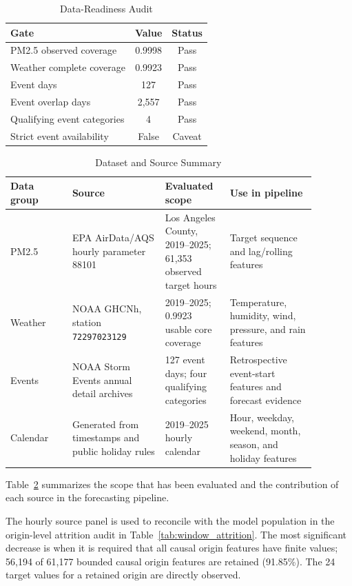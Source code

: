 \documentclass{ieeeaccess}
\begin{document}
\begin{table}[!t]
\centering
\caption{Data-Readiness Audit}
\label{tab:data_audit}
\begin{tabular}{lcc}
\toprule
Gate & Value & Status \\
\midrule
PM2.5 observed coverage & 0.9998 & Pass \\
Weather complete coverage & 0.9923 & Pass \\
Event days & 127 & Pass \\
Event overlap days & 2,557 & Pass \\
Qualifying event categories & 4 & Pass \\
Strict event availability & False & Caveat \\
\bottomrule
\end{tabular}
\end{table}

\begin{table}[!t]
\centering
\caption{Dataset and Source Summary}
\label{tab:dataset_summary}
\begin{tabular}{p{0.18\linewidth}p{0.27\linewidth}p{0.18\linewidth}p{0.25\linewidth}}
\toprule
Data group & Source & Evaluated scope & Use in pipeline \\
\midrule
PM2.5 & EPA AirData/AQS hourly parameter 88101 & Los Angeles County,
2019--2025; 61,353 observed target hours & Target sequence and lag/rolling
features \\
Weather & NOAA GHCNh, station \texttt{72297023129} & 2019--2025;
0.9923 usable core coverage & Temperature, humidity, wind, pressure, and rain
features \\
Events & NOAA Storm Events annual detail archives & 127 event days; four
qualifying categories & Retrospective event-start features and forecast evidence \\
Calendar & Generated from timestamps and public holiday rules & 2019--2025
hourly calendar & Hour, weekday, weekend, month, season, and holiday features \\
\bottomrule
\end{tabular}
\end{table}

Table~\ref{tab:dataset_summary} summarizes the scope that has been evaluated and the contribution of each source in the forecasting pipeline.

The hourly source panel is used to reconcile with the model population in the origin-level attrition audit in Table~\ref{tab:window_attrition}. The most significant decrease is when it is required that all causal origin features have finite values; 56,194 of 61,177 bounded causal origin features are retained (91.85\%). The 24 target values for a retained origin are directly observed.
\end{document}
